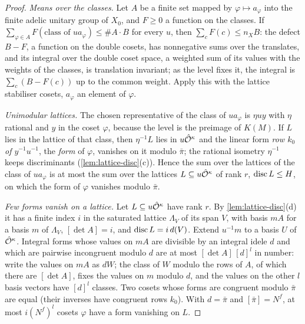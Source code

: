 \begin{proof}
\emph{Means over the classes.} Let $A$ be a finite set mapped by $\varphi\mapsto a_\varphi$ into the finite adelic unitary group of $X_0$, and $F\ge0$ a function on the classes. If $\sum_{\varphi\in A}F(\text{class of }ua_\varphi)\le\#A\cdot B$ for every
$u$, then $\sum_cF(c)\le n_XB$: the defect $B-F$, a function on the double cosets, has nonnegative sums over the translates, and its integral over the double coset space, a weighted sum of its values with
the weights of the classes, is translation invariant; as the level fixes it, the integral is $\sum_c(B-F(c))$ up to the common weight. Apply this with the lattice stabiliser cosets, $a_\varphi$ an element of $\varphi$.

\emph{Unimodular lattices.} The chosen representative of the class of $ua_\varphi$ is $\eta uy$ with $\eta$ rational and $y$ in the coset $\varphi$, because the level is the preimage of $K(M)$. If $L$ lies in the lattice of that class, then
$\eta^{-1}L$ lies in $u\hat{\mathcal{O}}^\kappa$ and the linear form \emph{row $k_0$ of $y^{-1}u^{-1}$}, the \emph{form} of $\varphi$, vanishes on it modulo $\bar\pi$; the rational isometry $\eta^{-1}$ keeps discriminants
(\cref{lem:lattice-disc}(c)). Hence the sum over the lattices of the class of $ua_\varphi$ is at most the sum over the lattices $L\subseteq u\hat{\mathcal{O}}^\kappa$ of rank $r$, $\operatorname{disc} L\le H$, on which the form of $\varphi$ vanishes modulo $\bar\pi$.

\emph{Few forms vanish on a lattice.} Let $L\subseteq u\hat{\mathcal{O}}^\kappa$ have rank $r$. By \cref{lem:lattice-disc}(d) it has a finite index $i$ in the saturated lattice $\Lambda_V$ of its span $V$, with basis $mA$ for a basis $m$ of
$\Lambda_V$, $[\det A]=i$, and $\operatorname{disc} L=i\,d(V)$. Extend $u^{-1}m$ to a basis $U$ of $\hat{\mathcal{O}}^\kappa$. Integral forms whose values on $mA$ are divisible by an integral idele $d$ and which are pairwise incongruent modulo $d$ are at most
$[\det A]\,[d]^l$ in number: write the values on $mA$ as $dW$; the class of $W$ modulo the rows of $A$, of which there are $[\det A]$, fixes the values on $m$ modulo $d$, and the values on the other $l$ basis vectors have $[d]^l$
classes. Two cosets whose forms are congruent modulo $\bar\pi$ are equal (their inverses have congruent rows $k_0$). With $d=\bar\pi$ and $[\bar\pi]=N^f$, at most $i(N^f)^l$ cosets $\varphi$ have a form vanishing on $L$.


\end{proof}
